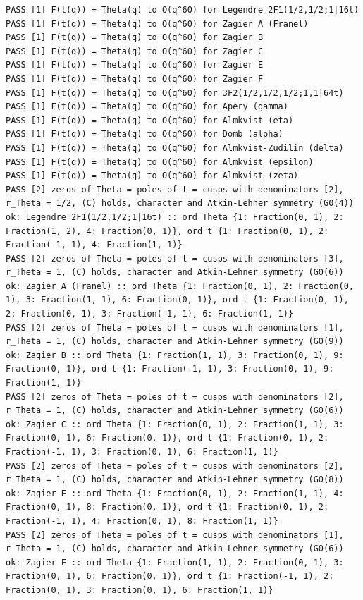 \documentclass[11pt,a4paper]{article}
\theoremstyle{definition}\newtheorem{definition}[theorem]{Definition}
\theoremstyle{remark}\newtheorem{remark}[theorem]{Remark}
\numberwithin{equation}{section}
\begin{document}
\begin{lstlisting}
PASS [1] F(t(q)) = Theta(q) to O(q^60) for Legendre 2F1(1/2,1/2;1|16t)
PASS [1] F(t(q)) = Theta(q) to O(q^60) for Zagier A (Franel)
PASS [1] F(t(q)) = Theta(q) to O(q^60) for Zagier B
PASS [1] F(t(q)) = Theta(q) to O(q^60) for Zagier C
PASS [1] F(t(q)) = Theta(q) to O(q^60) for Zagier E
PASS [1] F(t(q)) = Theta(q) to O(q^60) for Zagier F
PASS [1] F(t(q)) = Theta(q) to O(q^60) for 3F2(1/2,1/2,1/2;1,1|64t)
PASS [1] F(t(q)) = Theta(q) to O(q^60) for Apery (gamma)
PASS [1] F(t(q)) = Theta(q) to O(q^60) for Almkvist (eta)
PASS [1] F(t(q)) = Theta(q) to O(q^60) for Domb (alpha)
PASS [1] F(t(q)) = Theta(q) to O(q^60) for Almkvist-Zudilin (delta)
PASS [1] F(t(q)) = Theta(q) to O(q^60) for Almkvist (epsilon)
PASS [1] F(t(q)) = Theta(q) to O(q^60) for Almkvist (zeta)
PASS [2] zeros of Theta = poles of t = cusps with denominators [2], r_Theta = 1/2, (C) holds, character and Atkin-Lehner symmetry (G0(4)) ok: Legendre 2F1(1/2,1/2;1|16t) :: ord Theta {1: Fraction(0, 1), 2: Fraction(1, 2), 4: Fraction(0, 1)}, ord t {1: Fraction(0, 1), 2: Fraction(-1, 1), 4: Fraction(1, 1)}
PASS [2] zeros of Theta = poles of t = cusps with denominators [3], r_Theta = 1, (C) holds, character and Atkin-Lehner symmetry (G0(6)) ok: Zagier A (Franel) :: ord Theta {1: Fraction(0, 1), 2: Fraction(0, 1), 3: Fraction(1, 1), 6: Fraction(0, 1)}, ord t {1: Fraction(0, 1), 2: Fraction(0, 1), 3: Fraction(-1, 1), 6: Fraction(1, 1)}
PASS [2] zeros of Theta = poles of t = cusps with denominators [1], r_Theta = 1, (C) holds, character and Atkin-Lehner symmetry (G0(9)) ok: Zagier B :: ord Theta {1: Fraction(1, 1), 3: Fraction(0, 1), 9: Fraction(0, 1)}, ord t {1: Fraction(-1, 1), 3: Fraction(0, 1), 9: Fraction(1, 1)}
PASS [2] zeros of Theta = poles of t = cusps with denominators [2], r_Theta = 1, (C) holds, character and Atkin-Lehner symmetry (G0(6)) ok: Zagier C :: ord Theta {1: Fraction(0, 1), 2: Fraction(1, 1), 3: Fraction(0, 1), 6: Fraction(0, 1)}, ord t {1: Fraction(0, 1), 2: Fraction(-1, 1), 3: Fraction(0, 1), 6: Fraction(1, 1)}
PASS [2] zeros of Theta = poles of t = cusps with denominators [2], r_Theta = 1, (C) holds, character and Atkin-Lehner symmetry (G0(8)) ok: Zagier E :: ord Theta {1: Fraction(0, 1), 2: Fraction(1, 1), 4: Fraction(0, 1), 8: Fraction(0, 1)}, ord t {1: Fraction(0, 1), 2: Fraction(-1, 1), 4: Fraction(0, 1), 8: Fraction(1, 1)}
PASS [2] zeros of Theta = poles of t = cusps with denominators [1], r_Theta = 1, (C) holds, character and Atkin-Lehner symmetry (G0(6)) ok: Zagier F :: ord Theta {1: Fraction(1, 1), 2: Fraction(0, 1), 3: Fraction(0, 1), 6: Fraction(0, 1)}, ord t {1: Fraction(-1, 1), 2: Fraction(0, 1), 3: Fraction(0, 1), 6: Fraction(1, 1)}

\end{lstlisting}
\end{document}
